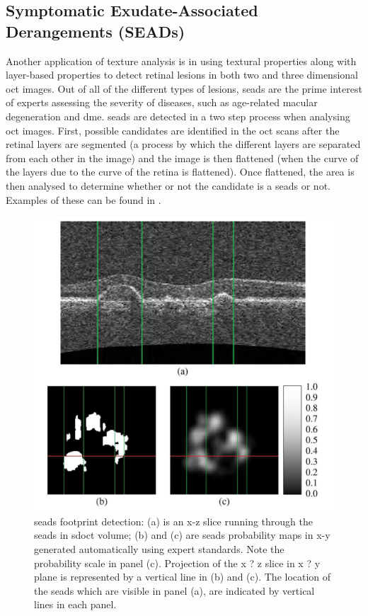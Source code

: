 \subsection{Symptomatic Exudate-Associated Derangements (SEADs)}
Another application of texture analysis is in using textural properties along with
layer-based properties to detect retinal lesions in both two and three dimensional
\Gls{oct} images. Out of all of the different types of lesions, \Gls{seads} are the prime interest of
experts assessing the severity of diseases, such as age-related macular degeneration and \Gls{dme}.  \Gls{seads} are detected in a two step process when analysing \Gls{oct} images.  First, possible candidates are identified in the \Gls{oct} scans after the retinal layers are segmented (a process by which the different layers are separated from each other in the image) and the image is then flattened (when the curve of the layers due to the curve of the retina is flattened).  Once flattened, the area is then analysed to determine whether or not the candidate is a \Gls{seads} or not. 
\cite{mbib_4} Examples of these can be found in .

\begin{figure}[H]
\centering
\includegraphics{figures/morgan_7}
\caption{\Gls{seads} footprint detection: (a) is an x-z slice running through the \Gls{seads} in \Gls{sdoct} volume; (b) and (c) are \Gls{seads} probability maps in x-y generated automatically using expert standards.  Note the probability scale in panel (c). Projection of the x ? z slice in x ? y plane is represented by a vertical line in (b) and (c). The location of the \Gls{seads} which are visible in panel (a), are indicated by vertical lines in each panel. \cite{mbib_4} }
\label{fig:m_7}
\end{figure}

